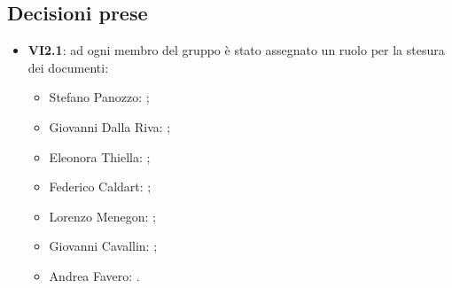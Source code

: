 	\subsection{Decisioni prese}
		\begin{itemize}
			\item \textbf{VI2.1}: ad ogni membro del gruppo è stato assegnato un ruolo per la stesura dei documenti:
			\begin{itemize}
				\item Stefano Panozzo: \RdP{};
				\item Giovanni Dalla Riva: \ana{};
				\item Eleonora Thiella: \ana{};
				\item Federico Caldart: \ana{};
				\item Lorenzo Menegon: \ver{};
				\item Giovanni Cavallin: \adm{};
				\item Andrea Favero: \adm{}.
			\end{itemize}
		\end{itemize}
